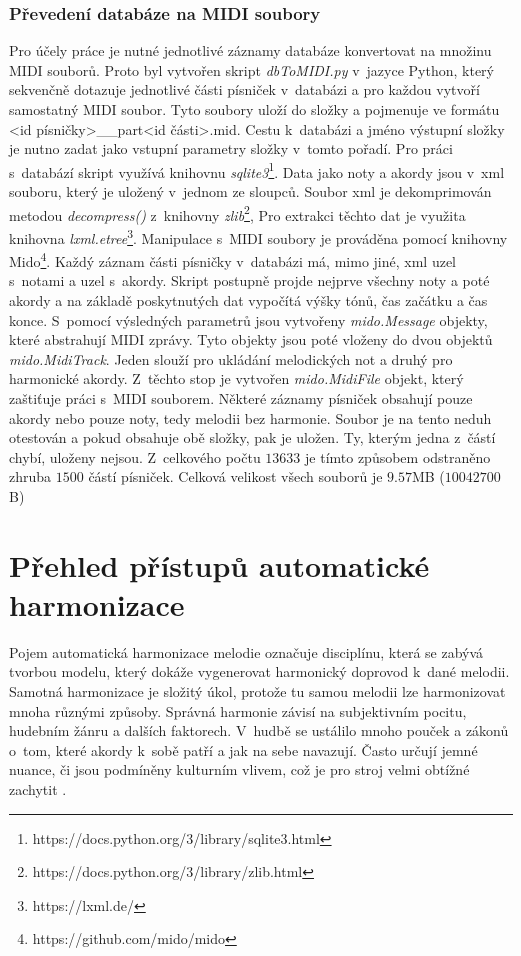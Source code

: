 \subsection{Převedení databáze na MIDI soubory}
Pro účely práce je nutné jednotlivé záznamy databáze
konvertovat na množinu MIDI souborů.
Proto byl vytvořen skript \emph{dbToMIDI.py} v~jazyce Python,
který sekvenčně dotazuje jednotlivé části písniček v~databázi
a pro každou vytvoří samostatný MIDI soubor.
Tyto soubory uloží do složky 
a pojmenuje ve formátu {<id písničky>\_\_part<id části>.mid}.
Cestu k~databázi a jméno výstupní složky 
je nutno zadat jako vstupní parametry složky v~tomto pořadí.
Pro práci s~databází skript využívá knihovnu \emph{sqlite3}\footnote{https://docs.python.org/3/library/sqlite3.html}.
Data jako noty a akordy jsou v~xml souboru, 
který je uložený v~jednom ze sloupců.
Soubor xml je dekomprimován metodou \emph{decompress()} z~knihovny 
\emph{zlib}\footnote{https://docs.python.org/3/library/zlib.html},
Pro extrakci těchto dat je využita knihovna \emph{lxml.etree}\footnote{https://lxml.de/}.
Manipulace s~MIDI soubory je prováděna pomocí knihovny Mido\footnote{https://github.com/mido/mido}.
Každý záznam části písničky v~databázi má, mimo jiné, 
xml uzel s~notami a uzel s~akordy.
Skript postupně projde nejprve všechny noty a poté akordy
a na základě poskytnutých dat vypočítá výšky tónů, čas začátku a čas konce.
S~pomocí výsledných parametrů jsou vytvořeny \emph{mido.Message} objekty,
které abstrahují MIDI zprávy.
Tyto objekty jsou poté vloženy do dvou objektů \emph{mido.MidiTrack}.
Jeden slouží pro ukládání melodických not a druhý pro harmonické akordy.
Z~těchto stop je vytvořen \emph{mido.MidiFile} objekt, který zaštiťuje práci s~MIDI souborem.
Některé záznamy písniček obsahují pouze akordy nebo pouze noty, tedy melodii bez harmonie.
Soubor je na tento neduh otestován a pokud obsahuje obě složky, pak je uložen.
Ty, kterým jedna z~částí chybí, uloženy nejsou.
Z~celkového počtu $13 633$ je tímto způsobem odstraněno zhruba $1500$ částí písniček.
Celková velikost všech souborů je $9.57$MB ($10 042 700$B)

\chapter{Přehled přístupů automatické harmonizace}
\label{prehledPristupus}
Pojem automatická harmonizace melodie označuje disciplínu, která se zabývá tvorbou modelu, 
který dokáže vygenerovat harmonický doprovod k~dané melodii.
Samotná harmonizace je složitý úkol, 
protože tu samou melodii lze harmonizovat mnoha různými způsoby.
Správná harmonie závisí na subjektivním pocitu, hudebním žánru a dalších faktorech.
V~hudbě se ustálilo mnoho pouček a zákonů o~tom, které akordy k~sobě patří
a jak na sebe navazují.
Často určují jemné nuance, či jsou podmíněny kulturním vlivem, 
což je pro stroj velmi obtížné zachytit
\cite{YinCheng_comparativeStudy}.
\par

